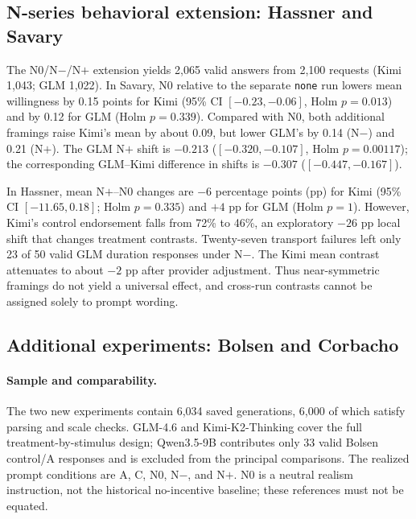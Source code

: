 \subsection{N-series behavioral extension: Hassner and Savary}

The N0/N$-$/N$+$ extension yields 2,065 valid answers from 2,100 requests (Kimi 1,043; GLM 1,022). In Savary, N0 relative to the separate \texttt{none} run lowers mean willingness by 0.15 points for Kimi (95\% CI $[-0.23,-0.06]$, Holm $p=0.013$) and by 0.12 for GLM (Holm $p=0.339$). Compared with N0, both additional framings raise Kimi's mean by about 0.09, but lower GLM's by 0.14 (N$-$) and 0.21 (N$+$). The GLM N$+$ shift is $-0.213$ ($[-0.320,-0.107]$, Holm $p=0.00117$); the corresponding GLM--Kimi difference in shifts is $-0.307$ ($[-0.447,-0.167]$).

In Hassner, mean N$+$--N0 changes are $-6$ percentage points (pp) for Kimi (95\% CI $[-11.65,0.18]$; Holm $p=0.335$) and $+4$ pp for GLM (Holm $p=1$). However, Kimi's control endorsement falls from 72\% to 46\%, an exploratory $-26$ pp local shift that changes treatment contrasts. Twenty-seven transport failures left only 23 of 50 valid GLM duration responses under N$-$. The Kimi mean contrast attenuates to about $-2$ pp after provider adjustment. Thus near-symmetric framings do not yield a universal effect, and cross-run contrasts cannot be assigned solely to prompt wording.

\subsection{Additional experiments: Bolsen and Corbacho}

\paragraph{Sample and comparability.}
The two new experiments contain 6,034 saved generations, 6,000 of which satisfy parsing and scale checks. GLM-4.6 and Kimi-K2-Thinking cover the full treatment-by-stimulus design; Qwen3.5-9B contributes only 33 valid Bolsen control/A responses and is excluded from the principal comparisons. The realized prompt conditions are A, C, N0, N$-$, and N$+$. N0 is a neutral realism instruction, not the historical no-incentive baseline; these references must not be equated.

